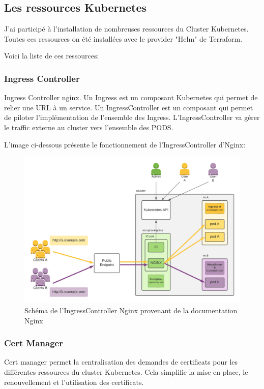 \documentclass[12pt, a4paper, twoside]{article}
\begin{document}
\subsection{Les ressources Kubernetes}
J'ai participé à l'installation de nombreuses ressources du Cluster \gls{Kubernetes}.
Toutes ces ressources on été installées avec le provider "Helm" de \gls{Terraform}.

Voici la liste de ces ressources:
\subsubsection{Ingress Controller}
Ingress Controller nginx. Un Ingress est un composant \gls{Kubernetes} qui permet de relier une URL à un service.
Un IngressController est un composant qui permet de piloter l'implémentation de l'ensemble des Ingress.
L'IngressController va gérer le traffic externe au \gls{cluster} vers l'ensemble des PODS.

L'image ci-dessous présente le fonctionnement de l'IngressController d'Nginx:

\begin{figure}[!ht]
    \centering
        \includegraphics[width=\textwidth]{src/graph_nginx.png}
    \caption{Schéma de l'IngressController Nginx provenant de la documentation Nginx}
    \label{fig:graph_nginx.png}
\end{figure}

\subsubsection{Cert Manager}
Cert manager permet la centralisation des demandes de certificats pour les différentes ressources du \gls{cluster} \gls{Kubernetes}.
Cela simplifie la mise en place, le renouvellement et l'utilisation des certificats.
\end{document}
